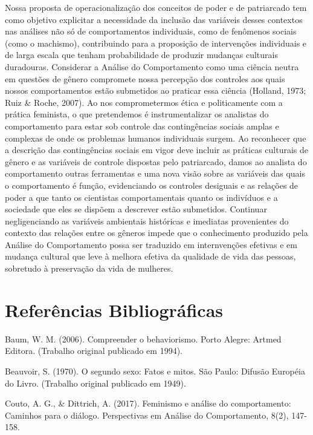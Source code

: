 Nossa proposta de operacionalização dos conceitos de poder e de patriarcado tem como objetivo explicitar a necessidade da inclusão das variáveis desses contextos nas análises não só de comportamentos individuais, como de fenômenos sociais (como o machismo), contribuindo para a proposição de intervenções individuais e de larga escala que tenham probabilidade de produzir mudanças culturais duradouras. Considerar a Análise do Comportamento como uma ciência neutra em questões de gênero compromete nossa percepção dos controles aos quais nossos comportamentos estão submetidos ao praticar essa ciência (Holland, 1973; Ruiz \& Roche, 2007). Ao nos comprometermos ética e politicamente com a prática feminista, o que pretendemos é instrumentalizar os analistas do comportamento para estar sob controle das contingências sociais amplas e complexas de onde os problemas humanos individuais surgem. Ao reconhecer que a descrição das contingências sociais em vigor deve incluir as práticas culturais de gênero e as variáveis de controle dispostas pelo patriarcado, damos ao analista do comportamento outras ferramentas e uma nova visão sobre as variáveis das quais o comportamento é função, evidenciando os controles desiguais e as relações de poder a que tanto os cientistas comportamentais quanto os indivíduos e a sociedade que eles se dispõem a descrever estão submetidos. Continuar negligenciando as variáveis ambientais históricas e imediatas provenientes do contexto das relações entre os gêneros impede que o conhecimento produzido pela Análise do Comportamento possa ser traduzido em internvenções efetivas e em mudança cultural que leve à melhora efetiva da qualidade de vida das pessoas, sobretudo à preservação da vida de mulheres.

\section*{Referências Bibliográficas}

\hangindent=25pt
\noindent Baum, W. M. (2006). Compreender o behaviorismo. Porto Alegre: Artmed Editora. (Trabalho original publicado em 1994).

\hangindent=25pt
\noindent Beauvoir, S. (1970). O segundo sexo: Fatos e mitos. São Paulo: Difusão Européia do Livro. (Trabalho original publicado em 1949).

\hangindent=25pt
\noindent Couto, A. G., \& Dittrich, A. (2017). Feminismo e análise do comportamento: Caminhos para o diálogo. Perspectivas em Análise do Comportamento, 8(2), 147-158.

